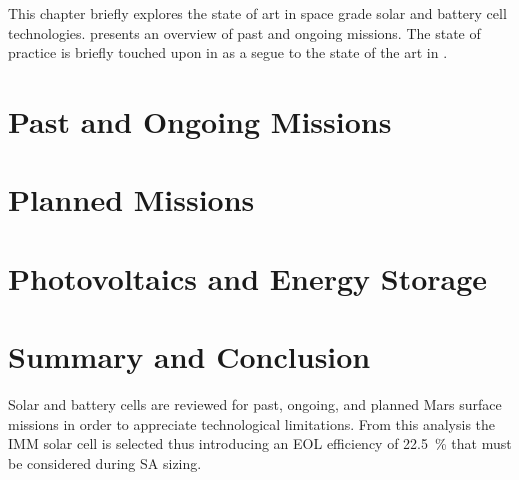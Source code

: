 This chapter briefly explores the state of art in space grade solar and battery cell technologies.  presents an overview of past and ongoing missions. The state of practice is briefly touched upon in  as a segue to the state of the art in .

\section{Past and Ongoing Missions}
\label{sec:StateOfTheArt:PastAndOngoingMissions}


\clearpage
\section{Planned Missions}
\label{sec:StateOfTheArt:PlannedMissions}


\clearpage
\section{Photovoltaics and Energy Storage}
\label{sec:StateOfTheArt:PhotovoltaicsAndEnergyStorage}


\section{Summary and Conclusion}
\label{sec:StateOfTheArt:SummaryAndConclusion}
Solar and battery cells are reviewed for past, ongoing, and planned Mars surface missions in order to appreciate technological limitations. From this analysis the \ac{IMM} solar cell is selected thus introducing an \ac{EOL} efficiency of \SI{22.5}{\percent} that must be considered during \ac{SA} sizing.
